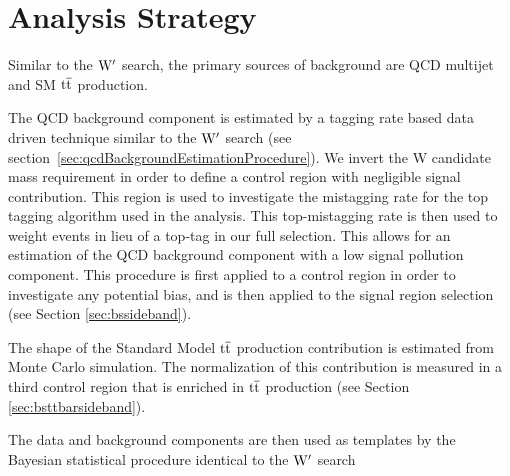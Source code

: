 \chapter{Analysis Strategy}
\label{sec:bsanalysisStrategy}
Similar to the $\mathrm{W}^{\prime}$ search, the primary sources of background are QCD multijet and SM $\mathrm{t\overline{t}}$ 
production.  

The QCD background component is estimated by a tagging rate based data driven technique similar 
to the $\mathrm{W}^{\prime}$ search (see section~\ref{sec:qcdBackgroundEstimationProcedure}).  We invert the W candidate mass requirement in order to define a control region with negligible signal contribution.  
This region is used to investigate the mistagging rate for the top tagging algorithm used in the analysis.  
This top-mistagging rate is then used to weight events in lieu of a top-tag in our full selection.  This allows for an estimation of the 
QCD background component with a low signal pollution component.  This procedure is first applied to a control region in order to  
investigate any potential bias, and is then applied to the signal region selection (see Section \ref{sec:bssideband}). 

The shape of the Standard Model $\mathrm{t\overline{t}}$ production contribution is estimated from Monte Carlo simulation.  The normalization of this contribution is 
measured in a third control region that is enriched in $\mathrm{t\overline{t}}$ production (see Section \ref{sec:bsttbarsideband}).

The data and background components are then used as templates by the Bayesian statistical procedure identical to the $\mathrm{W}^{\prime}$ search
